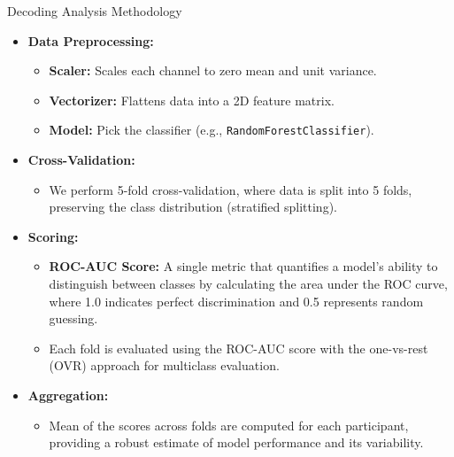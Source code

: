 \documentclass{beamer}
\begin{document}
\begin{frame}{Decoding Analysis Methodology}
    \begin{itemize}
        \item \textbf{Data Preprocessing:}
        \begin{itemize}
            \item \textbf{Scaler:} Scales each channel to zero mean and unit variance.
            \item \textbf{Vectorizer:} Flattens data into a 2D feature matrix.
            \item \textbf{Model:} Pick the classifier (e.g., \texttt{RandomForestClassifier}). 
        \end{itemize}
        \item \textbf{Cross-Validation:} 
        \begin{itemize}
            \item We perform 5-fold cross-validation, where data is split into 5 folds, preserving the class distribution (stratified splitting).
        \end{itemize}
        \item \textbf{Scoring:}
        \begin{itemize}
            \item \textbf{ROC-AUC Score:} A single metric that quantifies a model's ability to distinguish between classes by calculating the area under the ROC curve, where 1.0 indicates perfect discrimination and 0.5 represents random guessing.
            \item Each fold is evaluated using the ROC-AUC score with the one-vs-rest (OVR) approach for multiclass evaluation.
        \end{itemize}
        \item \textbf{Aggregation:}
        \begin{itemize}
            \item Mean of the scores across folds are computed for each participant, providing a robust estimate of model performance and its variability.
        \end{itemize}    
    \end{itemize}
\end{frame}
\end{document}
